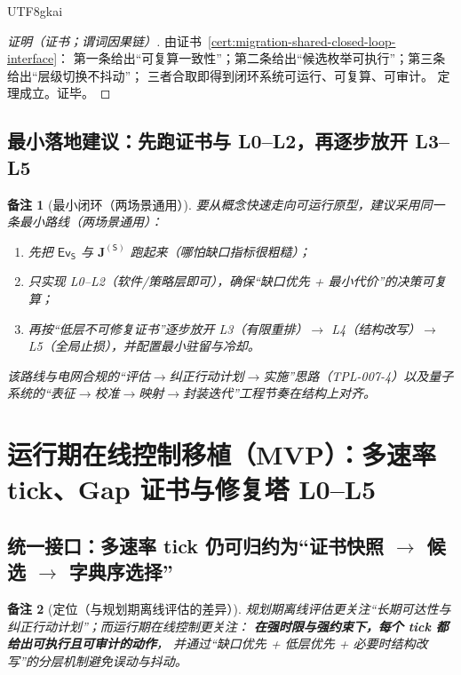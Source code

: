 \documentclass[12pt]{article}
\newtheorem{remark}{备注}[section]
\begin{document}
\begin{CJK*}{UTF8}{gkai}
\begin{proof}[证明（证书；谓词因果链）]
由证书~\ref{cert:migration-shared-closed-loop-interface}：
第一条给出“可复算一致性”；第二条给出“候选枚举可执行”；第三条给出“层级切换不抖动”；
三者合取即得到闭环系统可运行、可复算、可审计。
定理成立。证毕。
\end{proof}

\subsection{最小落地建议：先跑证书与 L0--L2，再逐步放开 L3--L5}
\label{sec:migration-minimal-roadmap}

\begin{remark}[最小闭环（两场景通用）]
要从概念快速走向可运行原型，建议采用同一条最小路线（两场景通用）：
\begin{enumerate}
  \item 先把 $\mathsf{Ev}_{\mathsf{S}}$ 与 $\mathbf{J}^{(\mathsf{S})}$ 跑起来（哪怕缺口指标很粗糙）；
  \item 只实现 L0--L2（软件/策略层即可），确保“缺口优先 + 最小代价”的决策可复算；
  \item 再按“低层不可修复证书”逐步放开 L3（有限重排）$\to$ L4（结构改写）$\to$ L5（全局止损），并配置最小驻留与冷却。
\end{enumerate}
该路线与电网合规的“评估$\to$纠正行动计划$\to$实施”思路（\textsf{TPL-007-4}）以及量子系统的“表征$\to$校准$\to$映射$\to$封装迭代”工程节奏在结构上对齐。
\end{remark}

\section{运行期在线控制移植（MVP）：多速率 tick、Gap 证书与修复塔 L0--L5}
\label{sec:online-control-mvp}

\subsection{统一接口：多速率 tick 仍可归约为“证书快照 $\to$ 候选 $\to$ 字典序选择”}
\label{sec:online-control-unified-interface}

\begin{remark}[定位（与规划期离线评估的差异）]
规划期离线评估更关注“长期可达性与纠正行动计划”；而运行期在线控制更关注：
\textbf{在强时限与强约束下，每个 tick 都给出可执行且可审计的动作}，
并通过“缺口优先 + 低层优先 + 必要时结构改写”的分层机制避免误动与抖动。
\end{remark}


\end{CJK*}
\end{document}
